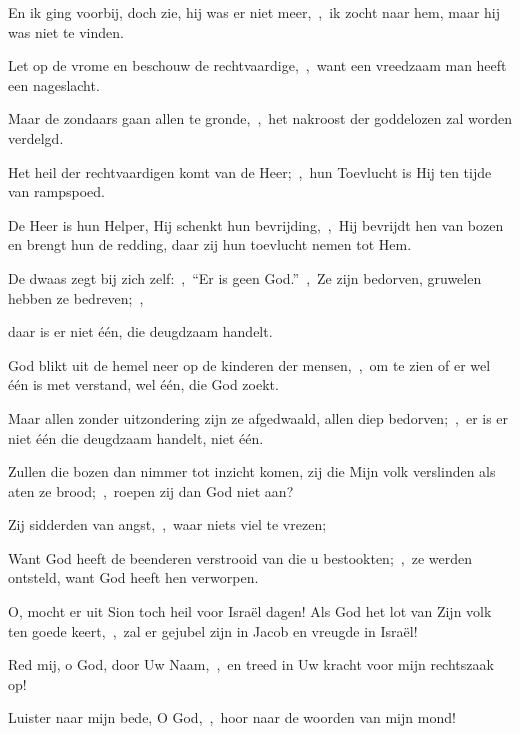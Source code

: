 \documentclass[12pt,twoside,a5paper]{article}
\begin{document}
\begin{halfparskip}
  En ik ging voorbij, doch zie, hij was er niet meer,~\sep\ ik zocht naar hem, maar hij was niet te vinden.

  Let op de vrome en beschouw de rechtvaardige,~\sep\ want een vreedzaam man heeft een nageslacht.

  Maar de zondaars gaan allen te gronde,~\sep\ het nakroost der goddelozen zal worden verdelgd.

  Het heil der rechtvaardigen komt van de Heer;~\sep\ hun Toevlucht is Hij ten tijde van rampspoed.

  De Heer is hun Helper, Hij schenkt hun bevrijding,~\sep\ Hij bevrijdt hen van bozen en brengt hun de redding, daar zij hun toevlucht nemen tot Hem.
\end{halfparskip}

\begin{halfparskip}

   De dwaas zegt bij zich zelf:~\sep\ ``Er is geen God.''~\sep\ Ze zijn bedorven, gruwelen hebben ze bedreven;~\sep


  daar is er niet één, die deugdzaam handelt.

  God blikt uit de hemel neer op de kinderen der mensen,~\sep\ om te zien of er wel één is met verstand, wel één, die God zoekt.

  Maar allen zonder uitzondering zijn ze afgedwaald, allen diep bedorven;~\sep\ er is er niet één die deugdzaam handelt, niet één.

  Zullen die bozen dan nimmer tot inzicht komen, zij die Mijn volk verslinden als aten ze brood;~\sep\ roepen zij dan God niet aan?

  Zij sidderden van angst,~\sep\ waar niets viel te vrezen;

  Want God heeft de beenderen verstrooid van die u bestookten;~\sep\ ze werden ontsteld, want God heeft hen verworpen.

  O, mocht er uit Sion toch heil voor Israël dagen! Als God het lot van Zijn volk ten goede keert,~\sep\ zal er gejubel zijn in Jacob en vreugde in Israël!

   Red mij, o God, door Uw Naam,~\sep\ en treed in Uw kracht voor mijn rechtszaak op!

  Luister naar mijn bede, O God,~\sep\ hoor naar de woorden van mijn mond!


\end{halfparskip}
\end{document}
